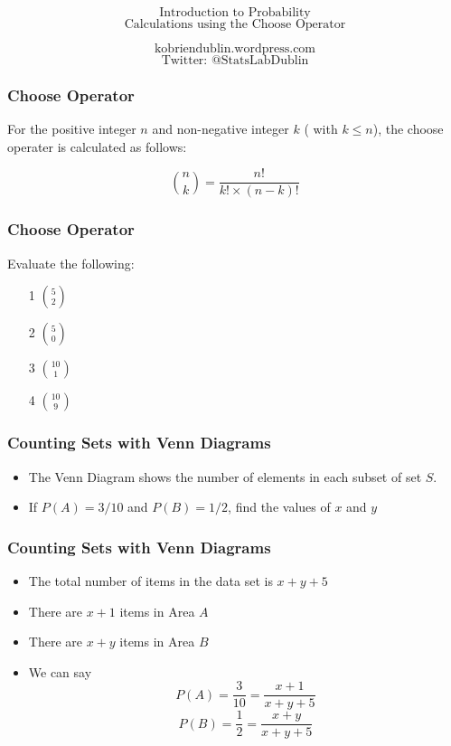 \documentclass{beamer}
\begin{document}
\begin{frame}
\Huge
\[\mbox{Introduction to Probability}\]
\LARGE
\[\mbox{Calculations using the Choose Operator}\]

\Large
\[\mbox{kobriendublin.wordpress.com}\]
\[\mbox{Twitter: @StatsLabDublin}\]

\end{frame}

\begin{frame}
\frametitle{Choose Operator}
\Large
For the positive integer $n$ and non-negative integer $k$ ( with $k\leq n$), the choose operater is calculated as follows:

\[ {n \choose k} = \frac{n!}{k! \times (n-k)!} \]

\end{frame}

\begin{frame}
\frametitle{Choose Operator}
\Large
\vspace{-1.5cm}
Evaluate the following:
\huge
\begin{itemize}
\item[1] ${5 \choose 2}$
\item[2] ${5 \choose 0}$
\item[3] ${10 \choose 1}$
\item[4] ${10 \choose 9}$
\end{itemize}
\end{frame}

\begin{frame}
\frametitle{Counting Sets with Venn Diagrams}
\Large
\vspace{-2cm}
\begin{itemize}
\item The Venn Diagram shows the number of elements in each subset of set $S$.
\item If $P(A) = 3/10$ and $P(B) = 1/2$, find the values of $x$ and $y$
\end{itemize}
\end{frame}



\begin{frame}
\frametitle{Counting Sets with Venn Diagrams}
\Large
\vspace{-1cm}
\begin{itemize}
\item The total number of items in the data set is $x+y+5$
\item There are $x+1$ items in Area $A$
\item There are $x+y$ items in Area $B$
\item We can say
\[ P(A) = \frac{3}{10} = \frac{x+1}{x+y+5}\]
\[ P(B) = \frac{1}{2} = \frac{x+y}{x+y+5} \]
\end{itemize}
\end{frame}
\end{document}
